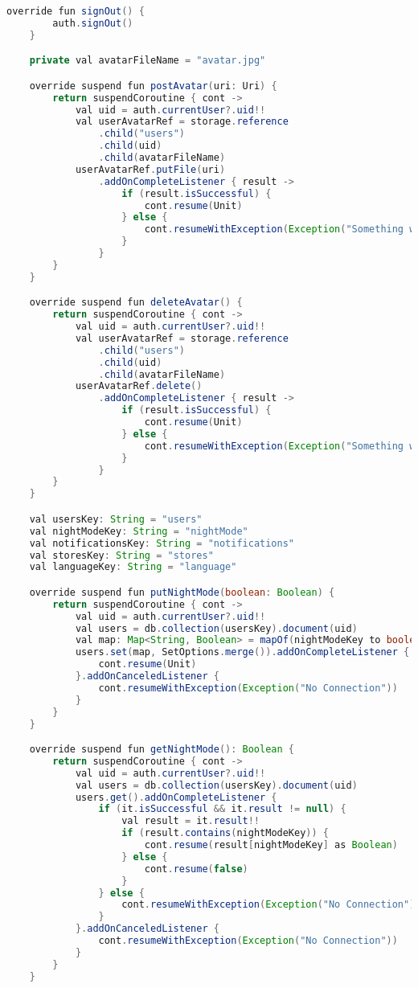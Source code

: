 \begin{lstlisting}[language=Java,label={lst:add:firebase}]
    override fun signOut() {
        auth.signOut()
    }

    private val avatarFileName = "avatar.jpg"

    override suspend fun postAvatar(uri: Uri) {
        return suspendCoroutine { cont ->
            val uid = auth.currentUser?.uid!!
            val userAvatarRef = storage.reference
                .child("users")
                .child(uid)
                .child(avatarFileName)
            userAvatarRef.putFile(uri)
                .addOnCompleteListener { result ->
                    if (result.isSuccessful) {
                        cont.resume(Unit)
                    } else {
                        cont.resumeWithException(Exception("Something went wrong"))
                    }
                }
        }
    }

    override suspend fun deleteAvatar() {
        return suspendCoroutine { cont ->
            val uid = auth.currentUser?.uid!!
            val userAvatarRef = storage.reference
                .child("users")
                .child(uid)
                .child(avatarFileName)
            userAvatarRef.delete()
                .addOnCompleteListener { result ->
                    if (result.isSuccessful) {
                        cont.resume(Unit)
                    } else {
                        cont.resumeWithException(Exception("Something went wrong"))
                    }
                }
        }
    }

    val usersKey: String = "users"
    val nightModeKey: String = "nightMode"
    val notificationsKey: String = "notifications"
    val storesKey: String = "stores"
    val languageKey: String = "language"

    override suspend fun putNightMode(boolean: Boolean) {
        return suspendCoroutine { cont ->
            val uid = auth.currentUser?.uid!!
            val users = db.collection(usersKey).document(uid)
            val map: Map<String, Boolean> = mapOf(nightModeKey to boolean)
            users.set(map, SetOptions.merge()).addOnCompleteListener {
                cont.resume(Unit)
            }.addOnCanceledListener {
                cont.resumeWithException(Exception("No Connection"))
            }
        }
    }

    override suspend fun getNightMode(): Boolean {
        return suspendCoroutine { cont ->
            val uid = auth.currentUser?.uid!!
            val users = db.collection(usersKey).document(uid)
            users.get().addOnCompleteListener {
                if (it.isSuccessful && it.result != null) {
                    val result = it.result!!
                    if (result.contains(nightModeKey)) {
                        cont.resume(result[nightModeKey] as Boolean)
                    } else {
                        cont.resume(false)
                    }
                } else {
                    cont.resumeWithException(Exception("No Connection"))
                }
            }.addOnCanceledListener {
                cont.resumeWithException(Exception("No Connection"))
            }
        }
    }


\end{lstlisting}

